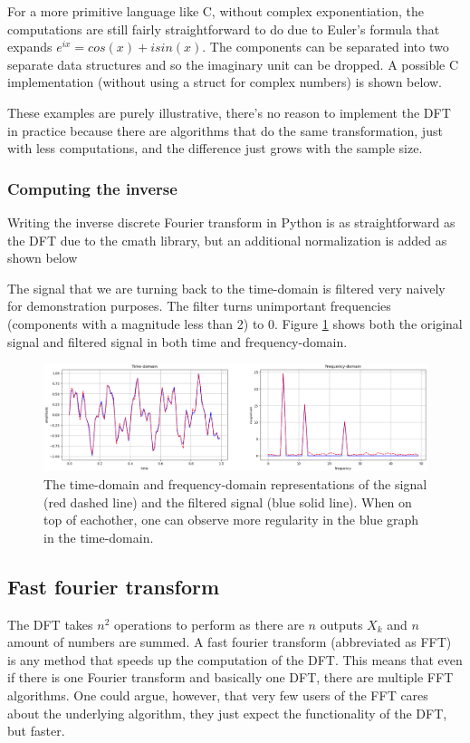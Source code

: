 

For a more primitive language like C, without complex exponentiation, the computations are still fairly straightforward to do due to Euler's formula that expands $e^{ix} = cos(x) + isin(x)$. The components can be separated into two separate data structures and so the imaginary unit can be dropped. A possible C implementation (without using a struct for complex numbers) is shown below. 



These examples are purely illustrative, there's no reason to implement the DFT in practice because there are algorithms that do the same transformation, just with less computations, and the difference just grows with the sample size.
\subsubsection{Computing the inverse}
Writing the inverse discrete Fourier transform in Python is as straightforward as the DFT due to the cmath library, but an additional normalization is added as shown below 




The signal that we are turning back to the time-domain is filtered very naively for demonstration purposes. The filter turns unimportant frequencies (components with a magnitude less than 2) to 0. Figure \ref{fig:DFT-IDFT} shows both the original signal and filtered signal in both time and frequency-domain.

\begin{figure}[ht]
    \centering
    \includegraphics[width=\textwidth]{./images/filtered_signal.png}
    \caption{The time-domain and frequency-domain representations of the signal (red dashed line) and the filtered signal (blue solid line). When on top of eachother, one can observe more regularity in the blue graph in the time-domain.\label{fig:DFT-IDFT}}
\end{figure}

\subsection{Fast fourier transform}
The DFT takes $n^2$ operations to perform as there are $n$ outputs $X_k$ and $n$ amount of numbers are summed. A fast fourier transform (abbreviated as FFT) is any method that speeds up the computation of the DFT. This means that even if there is one Fourier transform and basically one DFT, there are multiple FFT algorithms. One could argue, however, that very few users of the FFT cares about the underlying algorithm, they just expect the functionality of the DFT, but faster. 

